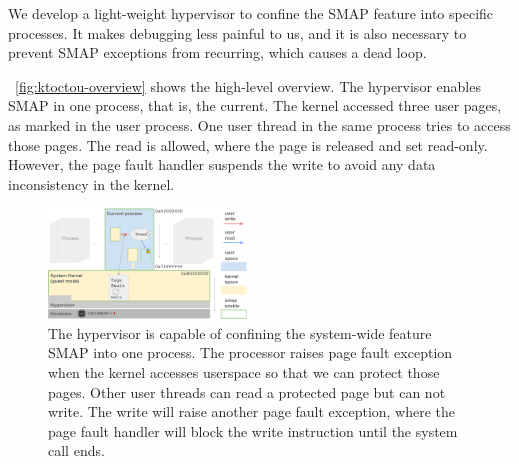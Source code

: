 We develop a light-weight hypervisor to confine the SMAP feature into specific processes. It makes debugging less painful to us, and it is also necessary to prevent SMAP exceptions from recurring, which causes a dead loop.

~\autoref{fig:ktoctou-overview} shows the high-level overview. The hypervisor enables SMAP in one process, that is, the current. The kernel accessed three user pages, as marked in the user process. One user thread in the same process tries to access those pages. The read is allowed, where the page is released and set read-only. However, the page fault handler suspends the write to avoid any data inconsistency in the kernel.


\begin{figure}[th]
  \includegraphics[width=0.47\textwidth]{figures/ktoctou-overview}
  \centering
  \caption{The hypervisor is capable of confining the system-wide feature SMAP into one process. The processor raises page fault exception when the kernel accesses userspace so that we can protect those pages. Other user threads can read a protected page but can not write. The write will raise another page fault exception, where the page fault handler will block the write instruction until the system call ends.}
  \label{fig:ktoctou-overview}
\end{figure}

